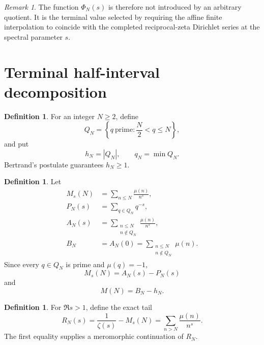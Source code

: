 \documentclass[11pt]{amsart}
\numberwithin{equation}{section}
\theoremstyle{plain}
\theoremstyle{definition}
\newtheorem{definition}[theorem]{Definition}
\theoremstyle{remark}
\newtheorem{remark}[theorem]{Remark}
\newcommand{\1}{\mathbf{1}}
\begin{document}
\begin{remark}
\label{rem:Phi_meaning}
The function \(\Phi_N(s)\) is therefore not introduced by an arbitrary
quotient.  It is the terminal value selected by requiring the affine finite
interpolation to coincide with the completed reciprocal-zeta Dirichlet
series at the spectral parameter \(s\).
\end{remark}

\section{Terminal half-interval decomposition}
\label{sec:mobius_definitions}

\begin{definition}
\label{def:terminal_prime_set}
For an integer \(N\geq 2\), define
\begin{equation}
Q_N
=
\left\{
q\ \text{prime}:\frac{N}{2}<q\leq N
\right\},
\label{eq:terminal_prime_set}
\end{equation}
and put
\begin{equation}
h_N=|Q_N|,
\qquad
q_N=\min Q_N.
\label{eq:hN_qN}
\end{equation}
Bertrand's postulate guarantees \(h_N\geq 1\).
\end{definition}

\begin{definition}
\label{def:mobius_polynomials}
Let
\begin{align}
M_s(N)
&=
\sum_{n\leq N}\frac{\mu(n)}{n^s},
\label{eq:MsN_definition}
\\
P_N(s)
&=
\sum_{q\in Q_N}q^{-s},
\label{eq:PN_definition}
\\
A_N(s)
&=
\sum_{\substack{n\leq N\\n\notin Q_N}}
\frac{\mu(n)}{n^s},
\label{eq:AN_definition}
\\
B_N
&=
A_N(0)
=
\sum_{\substack{n\leq N\\n\notin Q_N}}\mu(n).
\label{eq:BN_definition}
\end{align}
Since every \(q\in Q_N\) is prime and \(\mu(q)=-1\),
\begin{equation}
M_s(N)=A_N(s)-P_N(s)
\label{eq:Ms_A_minus_P}
\end{equation}
and
\begin{equation}
M(N)=B_N-h_N.
\label{eq:M_B_minus_h}
\end{equation}
\end{definition}

\begin{definition}
\label{def:tail_RN}
For \(\Re s>1\), define the exact tail
\begin{equation}
R_N(s)
=
\frac{1}{\zeta(s)}-M_s(N)
=
\sum_{n>N}\frac{\mu(n)}{n^s}.
\label{eq:RN_definition}
\end{equation}
The first equality supplies a meromorphic continuation of \(R_N\).
\end{definition}
\end{document}
